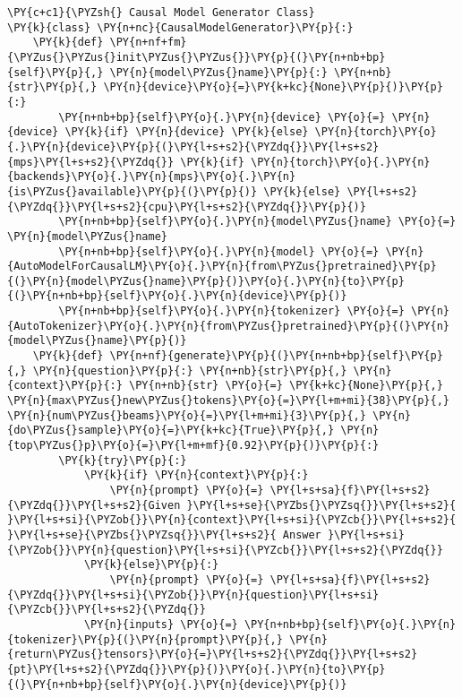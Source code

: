 \documentclass[11pt]{wseas}
\begin{document}
\begin{tcolorbox}[breakable, size=fbox, boxrule=1pt, pad at break*=1mm,colback=cellbackground, colframe=cellborder]
\begin{Verbatim}[commandchars=\\\{\}]
\PY{c+c1}{\PYZsh{} Causal Model Generator Class}
\PY{k}{class} \PY{n+nc}{CausalModelGenerator}\PY{p}{:}
    \PY{k}{def} \PY{n+nf+fm}{\PYZus{}\PYZus{}init\PYZus{}\PYZus{}}\PY{p}{(}\PY{n+nb+bp}{self}\PY{p}{,} \PY{n}{model\PYZus{}name}\PY{p}{:} \PY{n+nb}{str}\PY{p}{,} \PY{n}{device}\PY{o}{=}\PY{k+kc}{None}\PY{p}{)}\PY{p}{:}
        \PY{n+nb+bp}{self}\PY{o}{.}\PY{n}{device} \PY{o}{=} \PY{n}{device} \PY{k}{if} \PY{n}{device} \PY{k}{else} \PY{n}{torch}\PY{o}{.}\PY{n}{device}\PY{p}{(}\PY{l+s+s2}{\PYZdq{}}\PY{l+s+s2}{mps}\PY{l+s+s2}{\PYZdq{}} \PY{k}{if} \PY{n}{torch}\PY{o}{.}\PY{n}{backends}\PY{o}{.}\PY{n}{mps}\PY{o}{.}\PY{n}{is\PYZus{}available}\PY{p}{(}\PY{p}{)} \PY{k}{else} \PY{l+s+s2}{\PYZdq{}}\PY{l+s+s2}{cpu}\PY{l+s+s2}{\PYZdq{}}\PY{p}{)}
        \PY{n+nb+bp}{self}\PY{o}{.}\PY{n}{model\PYZus{}name} \PY{o}{=} \PY{n}{model\PYZus{}name}
        \PY{n+nb+bp}{self}\PY{o}{.}\PY{n}{model} \PY{o}{=} \PY{n}{AutoModelForCausalLM}\PY{o}{.}\PY{n}{from\PYZus{}pretrained}\PY{p}{(}\PY{n}{model\PYZus{}name}\PY{p}{)}\PY{o}{.}\PY{n}{to}\PY{p}{(}\PY{n+nb+bp}{self}\PY{o}{.}\PY{n}{device}\PY{p}{)}
        \PY{n+nb+bp}{self}\PY{o}{.}\PY{n}{tokenizer} \PY{o}{=} \PY{n}{AutoTokenizer}\PY{o}{.}\PY{n}{from\PYZus{}pretrained}\PY{p}{(}\PY{n}{model\PYZus{}name}\PY{p}{)}
    \PY{k}{def} \PY{n+nf}{generate}\PY{p}{(}\PY{n+nb+bp}{self}\PY{p}{,} \PY{n}{question}\PY{p}{:} \PY{n+nb}{str}\PY{p}{,} \PY{n}{context}\PY{p}{:} \PY{n+nb}{str} \PY{o}{=} \PY{k+kc}{None}\PY{p}{,} \PY{n}{max\PYZus{}new\PYZus{}tokens}\PY{o}{=}\PY{l+m+mi}{38}\PY{p}{,} \PY{n}{num\PYZus{}beams}\PY{o}{=}\PY{l+m+mi}{3}\PY{p}{,} \PY{n}{do\PYZus{}sample}\PY{o}{=}\PY{k+kc}{True}\PY{p}{,} \PY{n}{top\PYZus{}p}\PY{o}{=}\PY{l+m+mf}{0.92}\PY{p}{)}\PY{p}{:}
        \PY{k}{try}\PY{p}{:}
            \PY{k}{if} \PY{n}{context}\PY{p}{:}
                \PY{n}{prompt} \PY{o}{=} \PY{l+s+sa}{f}\PY{l+s+s2}{\PYZdq{}}\PY{l+s+s2}{Given }\PY{l+s+se}{\PYZbs{}\PYZsq{}}\PY{l+s+s2}{ }\PY{l+s+si}{\PYZob{}}\PY{n}{context}\PY{l+s+si}{\PYZcb{}}\PY{l+s+s2}{ }\PY{l+s+se}{\PYZbs{}\PYZsq{}}\PY{l+s+s2}{ Answer }\PY{l+s+si}{\PYZob{}}\PY{n}{question}\PY{l+s+si}{\PYZcb{}}\PY{l+s+s2}{\PYZdq{}}
            \PY{k}{else}\PY{p}{:}
                \PY{n}{prompt} \PY{o}{=} \PY{l+s+sa}{f}\PY{l+s+s2}{\PYZdq{}}\PY{l+s+si}{\PYZob{}}\PY{n}{question}\PY{l+s+si}{\PYZcb{}}\PY{l+s+s2}{\PYZdq{}}
            \PY{n}{inputs} \PY{o}{=} \PY{n+nb+bp}{self}\PY{o}{.}\PY{n}{tokenizer}\PY{p}{(}\PY{n}{prompt}\PY{p}{,} \PY{n}{return\PYZus{}tensors}\PY{o}{=}\PY{l+s+s2}{\PYZdq{}}\PY{l+s+s2}{pt}\PY{l+s+s2}{\PYZdq{}}\PY{p}{)}\PY{o}{.}\PY{n}{to}\PY{p}{(}\PY{n+nb+bp}{self}\PY{o}{.}\PY{n}{device}\PY{p}{)}

\end{Verbatim}
\end{tcolorbox}
\end{document}
